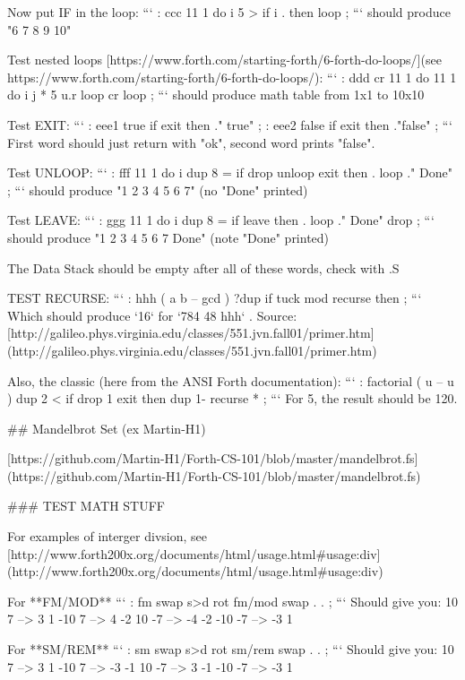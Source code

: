 Now put IF in the loop:
```
: ccc 11 1 do  i 5 > if i . then loop ; 
```
should produce "6 7 8 9 10"

Test nested loops [https://www.forth.com/starting-forth/6-forth-do-loops/](see https://www.forth.com/starting-forth/6-forth-do-loops/):
```
: ddd cr 11 1 do
    11 1 do 
        i j * 5 u.r 
    loop cr loop ;
```
should produce math table from 1x1 to 10x10

Test EXIT:
```
: eee1 true if exit then ." true" ; 
: eee2 false if exit then ."false" ; 
```
First word should just return with "ok", second word prints "false".

Test UNLOOP: 
```
: fff 11 1 do i dup 8 = if drop unloop exit then . loop ." Done" ; 
```
should produce "1 2 3 4 5 6 7" (no "Done" printed)

Test LEAVE:
```
: ggg 11 1 do i dup 8 = if leave then . loop ." Done" drop ; 
```
should produce "1 2 3 4 5 6 7 Done" (note "Done" printed)

The Data Stack should be empty after all of these words, check with .S


TEST RECURSE:
```
: hhh ( a b -- gcd ) ?dup if tuck mod recurse then ;
```
Which should produce `16` for `784 48 hhh` . Source: 
[http://galileo.phys.virginia.edu/classes/551.jvn.fall01/primer.htm]
(http://galileo.phys.virginia.edu/classes/551.jvn.fall01/primer.htm)

Also, the classic (here from the ANSI Forth documentation):
```
: factorial ( u -- u ) 
   dup 2 < if drop 1 exit then 
   dup 1- recurse * ;
```
For 5, the result should be 120.



## Mandelbrot Set (ex Martin-H1)

[https://github.com/Martin-H1/Forth-CS-101/blob/master/mandelbrot.fs](https://github.com/Martin-H1/Forth-CS-101/blob/master/mandelbrot.fs)


### TEST MATH STUFF

For examples of interger divsion, see
[http://www.forth200x.org/documents/html/usage.html#usage:div](http://www.forth200x.org/documents/html/usage.html#usage:div)

For **FM/MOD**
```
: fm swap s>d rot fm/mod swap . . ; 
```
Should give you: 
10 7 --> 3 1
-10 7 --> 4 -2 
10 -7 --> -4 -2
-10 -7 --> -3 1

For **SM/REM**
```
: sm swap s>d rot sm/rem swap . . ; 
```
Should give you: 
10 7 --> 3 1
-10 7 --> -3 -1 
10 -7 --> 3 -1
-10 -7 --> -3 1

